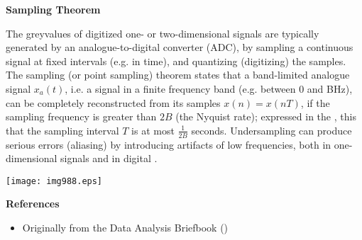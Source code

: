 \documentclass{article}
\begin{document}
{\bf Sampling Theorem}

The greyvalues of digitized one- or two-dimensional signals are typically generated by an analogue-to-digital converter (ADC), by sampling a continuous signal at fixed intervals (e.g. in time), and quantizing (digitizing) the samples. The sampling (or point sampling) theorem states that a band-limited analogue signal $x_a(t)$, i.e. a signal in a finite frequency band (e.g. between 0 and BHz), can be completely reconstructed from its samples $x(n) = x(nT)$, if the sampling frequency is greater than $2B$ (the Nyquist rate); expressed in the , this  that the sampling interval $T$ is at most $\frac{1}{2B}$ seconds. Undersampling can produce serious errors (aliasing) by introducing artifacts of low frequencies, both in one-dimensional signals and in digital .

\begin{center}
\texttt{[image: img988.eps]}
\end{center}

{\bf References}
\begin{itemize}
\item Originally from the Data Analysis Briefbook ()
\end{itemize}
\end{document}
